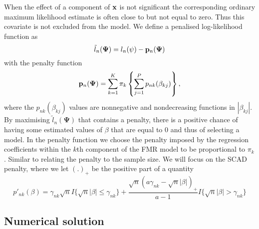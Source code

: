\documentclass{article}
\newcommand{\bx}{{\bf{x}}}                                                 %
\newcommand{\bPsi}{\boldsymbol \Psi}                              %
\newcommand{\bp}{{\bf p}}                                  %
\begin{document}
When the effect of a component of $\bx$ is not significant the corresponding ordinary maximum likelihood estimate is often close to but not equal to zero. Thus this covariate is not excluded from the model. We define a penalised log-likelihood function as
	$${\tilde l_n} ( \bPsi ) = l_n( \psi ) - \bp_n ( \bPsi )$$
with the penalty function
	$$ \bp_n ( \bPsi ) = \sum_{k=1}^K \pi_k \left \{ \sum_{j=1}^P p_{nk}( \beta_{kj} ) \right \}, $$
where the $ p_{nk}( \beta_{kj} ) $ values are nonnegative and nondecreasing functions in $|\beta_{kj}|$. By maximising $ {\tilde l_n} ( \bPsi ) $ that contains a penalty, there is a positive chance of having some estimated values of $\beta$ that are equal to 0 and thus of selecting a model. In the penalty function we choose the penalty imposed by the regression coefficients within the $k$th component of the FMR model to be proportional to $\pi_k$. Similar to relating the penalty to the sample size. We will focus on the SCAD penalty, where we let $(.)_+$ be the positive part of a quantity
	$$ p'_{nk} ( \beta ) = \gamma_{nk} \sqrt{n} I \{ \sqrt{n} |\beta| \leq \gamma_{nk} \} 
	+ \frac{ \sqrt{n} ( a \gamma_{nk} - \sqrt{n}|\beta|)_+}{a - 1}I\{ \sqrt{n}|\beta| > \gamma_{nk} \}$$


\subsection*{Numerical solution}
\end{document}
